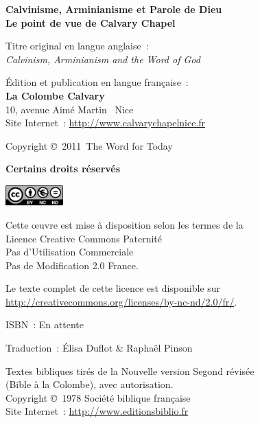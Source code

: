 \newpage
\mbox{}
\vfill

{\scriptsize

{\bfseries Calvinisme, Arminianisme et Parole de Dieu\\
Le point de vue de Calvary Chapel}

Titre original en langue anglaise~:\\
\emph{Calvinism, Arminianism and the Word of God}

Édition et publication en langue française~:\\
{\bfseries La Colombe Calvary}\\
10, avenue Aimé Martin ~Nice\\
Site Internet~: \url{http://www.calvarychapelnice.fr}

Copyright \copyright{}~2011~The Word for Today

{\bfseries Certains droits réservés}

\includegraphics[width=6em]{by-nc-nd_eu}

Cette \oe{}uvre est mise à disposition selon les termes de la \\
 Licence Creative Commons Paternité \\
 \ocadr Pas d'Utilisation Commerciale \\
 \ocadr Pas de Modification 2.0 France.

Le texte complet de cette licence est disponible sur \\
 \url{http://creativecommons.org/licenses/by-nc-nd/2.0/fr/}.

ISBN~: En attente

Traduction~: Élisa Duflot \& Raphaël Pinson

Textes bibliques tirés de la Nouvelle version Segond révisée \\
 (Bible à la Colombe), avec autorisation. \\
 Copyright \copyright{}~1978 Société biblique française \\
Site Internet~: \url{http://www.editionsbiblio.fr}

}
\enlargethispage{\footskip}
